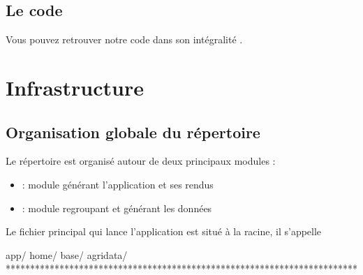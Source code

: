 \documentclass[letterpaper,10pt,french]{sphinxmanual}
\begin{document}
\subsection{Le code}
\label{\detokenize{intro:le-code}}
\sphinxAtStartPar
Vous pouvez retrouver notre code dans son intégralité .


\section{Infrastructure}
\label{\detokenize{infrastructure:infrastructure}}\label{\detokenize{infrastructure::doc}}

\subsection{Organisation globale du répertoire}
\label{\detokenize{infrastructure:organisation-globale-du-repertoire}}
\sphinxAtStartPar
Le répertoire est organisé autour de deux principaux modules :
\begin{itemize}
\item {} 
\sphinxAtStartPar
{} : module générant l’application et ses rendus

\item {} 
\sphinxAtStartPar
{} : module regroupant et générant les données

\end{itemize}

\sphinxAtStartPar
Le fichier principal qui lance l’application est situé à la racine, il s’appelle 

\begin{sphinxVerbatim}[commandchars=\\\{\}]
\PYGZhy{}\PYGZhy{} app/                                      
    \PYGZhy{}\PYGZhy{} home/                                
    \PYGZhy{}\PYGZhy{} base/                                
\PYGZhy{}\PYGZhy{} agri\PYGZus{}data/                                
\PYGZhy{}\PYGZhy{} ************************************************************************
\end{sphinxVerbatim}
\end{document}
